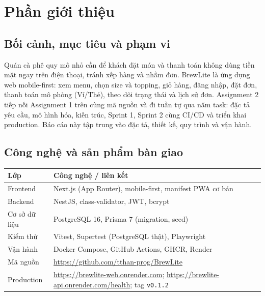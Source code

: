 \documentclass[a4paper]{article}
\begin{document}
\thispagestyle{empty}

\newpage
\tableofcontents
\newpage

\section{Phần giới thiệu}
\subsection{Bối cảnh, mục tiêu và phạm vi}
Quán cà phê quy mô nhỏ cần để khách đặt món và thanh toán không dùng tiền mặt ngay trên điện thoại, tránh xếp hàng và nhầm đơn. BrewLite là ứng dụng web mobile-first: xem menu, chọn size và topping, giỏ hàng, đăng nhập, đặt đơn, thanh toán mô phỏng (Ví/Thẻ), theo dõi trạng thái và lịch sử đơn. Assignment 2 tiếp nối Assignment 1 trên cùng mã nguồn và đi tuần tự qua năm task: đặc tả yêu cầu, mô hình hóa, kiến trúc, Sprint 1, Sprint 2 cùng CI/CD và triển khai production. Báo cáo này tập trung vào đặc tả, thiết kế, quy trình và vận hành.

\subsection{Công nghệ và sản phẩm bàn giao}
\begin{center}
\small\everymath{}
\begin{tabular}{@{}p{2.8cm}p{11.2cm}@{}}
\toprule
\textbf{Lớp} & \textbf{Công nghệ / liên kết} \\ \midrule
Frontend & Next.js (App Router), mobile-first, manifest PWA cơ bản \\
Backend & NestJS, class-validator, JWT, bcrypt \\
Cơ sở dữ liệu & PostgreSQL 16, Prisma 7 (migration, seed) \\
Kiểm thử & Vitest, Supertest (PostgreSQL thật), Playwright \\
Vận hành & Docker Compose, GitHub Actions, GHCR, Render \\
Mã nguồn & \url{https://github.com/tthan-prog/BrewLite} \\
Production & \url{https://brewlite-web.onrender.com}; \url{https://brewlite-api.onrender.com/health}; tag \texttt{v0.1.2} \\
\bottomrule
\end{tabular}
\end{center}
\end{document}
